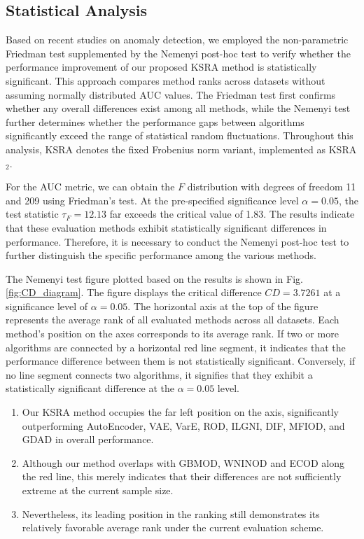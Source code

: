 \documentclass[ASNA,twocolumn]{USG} %
\begin{document}
\subsection{Statistical Analysis}

Based on recent studies \cite{cheng2025gbmod,su2025identifying,su2025granular} on anomaly detection, we employed the non-parametric Friedman test supplemented by the Nemenyi post-hoc test to verify whether the performance improvement of our proposed KSRA method is statistically significant. This approach compares method ranks across datasets without assuming normally distributed AUC values. The Friedman test first confirms whether any overall differences exist among all methods, while the Nemenyi test further determines whether the performance gaps between algorithms significantly exceed the range of statistical random fluctuations. Throughout this analysis, KSRA denotes the fixed Frobenius norm variant, implemented as KSRA$_2$.

For the AUC metric, we can obtain the $F$ distribution with degrees of freedom 11 and 209 using Friedman's test. At the pre-specified significance level $\alpha=0.05$, the test statistic $\tau_F=12.13$ far exceeds the critical value of 1.83. The results indicate that these evaluation methods exhibit statistically significant differences in performance. Therefore, it is necessary to conduct the Nemenyi post-hoc test to further distinguish the specific performance among the various methods.

The Nemenyi test figure plotted based on the results is shown in Fig.\ref{fig:CD_diagram}. The figure displays the critical difference $CD=3.7261$ at a significance level of $\alpha = 0.05$. The horizontal axis at the top of the figure represents the average rank of all evaluated methods across all datasets. Each method's position on the axes corresponds to its average rank. If two or more algorithms are connected by a horizontal red line segment, it indicates that the performance difference between them is not statistically significant. Conversely, if no line segment connects two algorithms, it signifies that they exhibit a statistically significant difference at the $\alpha = 0.05$ level.

\begin{enumerate}[\indent (1)]
    \item Our KSRA method occupies the far left position on the axis, significantly outperforming AutoEncoder, VAE, VarE, ROD, ILGNI, DIF, MFIOD, and GDAD in overall performance.
    \item Although our method overlaps with GBMOD, WNINOD and ECOD along the red line, this merely indicates that their differences are not sufficiently extreme at the current sample size.
    \item Nevertheless, its leading position in the ranking still demonstrates its relatively favorable average rank under the current evaluation scheme.
\end{enumerate}
\end{document}
